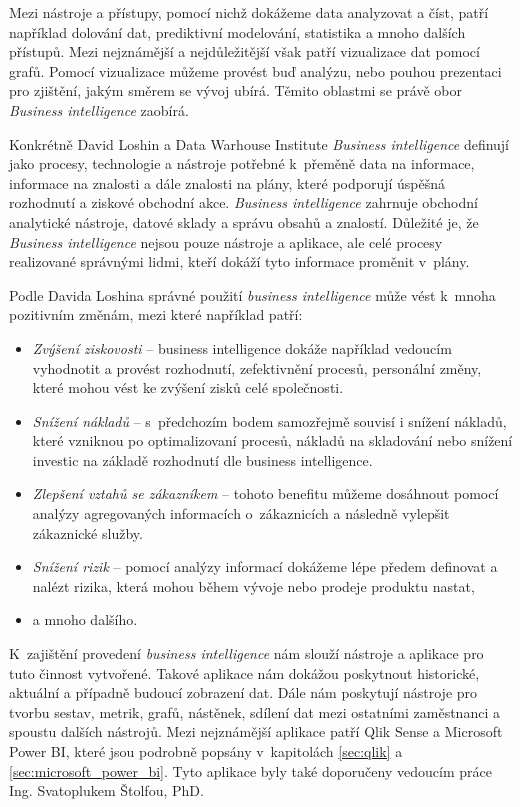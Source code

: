 \documentclass[czech,master]{diploma}
\begin{document}
Mezi nástroje a přístupy, pomocí nichž dokážeme data analyzovat a číst, patří například dolování dat, prediktivní modelování, statistika a mnoho dalších přístupů. Mezi nejznámější a nejdůležitější však patří vizualizace dat pomocí grafů. Pomocí vizualizace můžeme provést buď analýzu, nebo pouhou prezentaci pro zjištění, jakým směrem se vývoj ubírá. Těmito oblastmi se právě obor \textit{Business intelligence} zaobírá.

Konkrétně David Loshin \cite{ref:bi_loshin_david} a Data Warhouse Institute \textit{Business intelligence} definují jako procesy, technologie a nástroje potřebné k~přeměně data na informace, informace na znalosti a dále znalosti na plány, které podporují úspěšná rozhodnutí a ziskové obchodní akce. \textit{Business intelligence} zahrnuje obchodní analytické nástroje, datové sklady a správu obsahů a znalostí. Důležité je, že \textit{Business intelligence} nejsou pouze nástroje a aplikace, ale celé procesy realizované správnými lidmi, kteří dokáží tyto informace proměnit v~plány.

Podle Davida Loshina \cite{ref:bi_loshin_david} správné použití \textit{business intelligence} může vést k~mnoha pozitivním změnám, mezi které například patří:

\begin{itemize}
\item \textit{Zvýšení ziskovosti} -- business intelligence dokáže například vedoucím vyhodnotit a provést rozhodnutí, zefektivnění procesů, personální změny, které mohou vést ke zvýšení zisků celé společnosti.
\item \textit{Snížení nákladů} -- s~předchozím bodem samozřejmě souvisí i snížení nákladů, které vzniknou po optimalizovaní procesů, nákladů na skladování nebo snížení investic na základě rozhodnutí dle business intelligence.
\item \textit{Zlepšení vztahů se zákazníkem} -- tohoto benefitu můžeme dosáhnout pomocí analýzy agregovaných informacích o~zákaznicích a následně vylepšit zákaznické služby.
\item \textit{Snížení rizik} -- pomocí analýzy informací dokážeme lépe předem definovat a nalézt rizika, která mohou během vývoje nebo prodeje produktu nastat,
\item a mnoho dalšího.
\end{itemize}

K~zajištění provedení \textit{business intelligence} nám slouží nástroje a aplikace pro tuto činnost vytvořené. Takové aplikace nám dokážou poskytnout historické, aktuální a případně budoucí zobrazení dat. Dále nám poskytují nástroje pro tvorbu sestav, metrik, grafů, nástěnek, sdílení dat mezi ostatními zaměstnanci a spoustu dalších nástrojů. Mezi nejznámější aplikace patří Qlik Sense a Microsoft Power BI, které jsou podrobně popsány v~kapitolách \ref{sec:qlik} a \ref{sec:microsoft_power_bi}. Tyto aplikace byly také doporučeny vedoucím práce Ing. Svatoplukem Štolfou, PhD.
\end{document}
